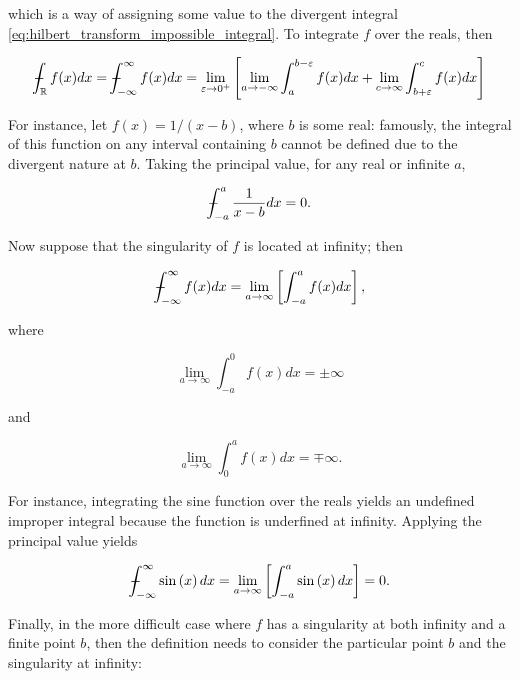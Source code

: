 	\noindent which is a way of assigning some value to the divergent integral \eqref{eq:hilbert_transform_impossible_integral}. To integrate $f$ over the reals, then

\begin{equation} \dashint_{\mathbb{R}} f(x)dx = \dashint_{-\infty}^{\infty} f(x)dx = \lim\limits_{\varepsilon\to 0^+} \left[ \lim\limits_{a\to -\infty} \int_{a}^{b-\varepsilon} f(x)dx + \lim\limits_{c\to\infty} \int_{b+\varepsilon}^{c} f(x)dx  \right]\end{equation}

	For instance, let $f(x) = 1/\left(x-b\right)$, where $b$ is some real: famously, the integral of this function on any interval containing $b$ cannot be defined due to the divergent nature at $b$. Taking the principal value, for any real or infinite $a$, 

\begin{equation} \dashint_{-a}^{a} \dfrac{1}{x-b}dx = 0. \end{equation}

	Now suppose that the singularity of $f$ is located at infinity; then

\begin{equation} \dashint_{-\infty}^{\infty} f(x)dx = \lim\limits_{a\to\infty} \left[\int_{-a}^{a} f(x)dx \right], \end{equation}

	\noindent where

\begin{equation} \lim\limits_{a\to\infty} \int_{-a}^{0} f(x)dx = \pm \infty\end{equation}

	\noindent and

\begin{equation} \lim\limits_{a\to\infty} \int_{0}^{a} f(x)dx = \mp \infty .\end{equation}

	For instance, integrating the sine function over the reals yields an undefined improper integral because the function is underfined at infinity. Applying the principal value yields

\begin{equation} \dashint_{-\infty}^{\infty} \sin\left(x\right) dx = \lim\limits_{a\to\infty} \left[\int_{-a}^{a} \sin\left(x\right) dx \right] = 0 . \end{equation}

	Finally, in the more difficult case where $f$ has a singularity at both infinity and a finite point $b$, then the definition needs to consider the particular point $b$ and the singularity at infinity:

